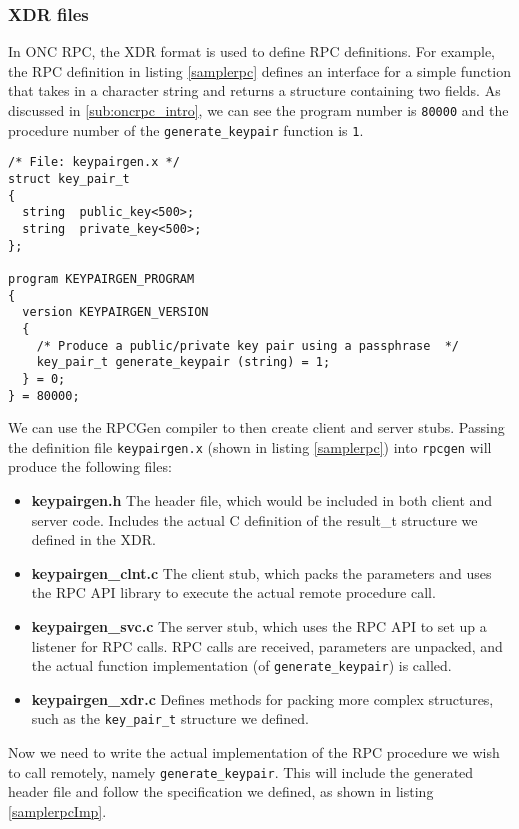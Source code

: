 \subsubsection{XDR files}
\label{sec:xdrsyntax}
In ONC RPC, the XDR format is used to define RPC definitions. For example, the RPC definition in listing \ref{samplerpc} defines an interface for a simple function that takes in a character string  and returns a structure containing two fields. As discussed in \ref{sub:oncrpc_intro}, we can see the program number is \lstinline+80000+ and the procedure number of the \lstinline+generate_keypair+ function is \lstinline+1+.

\begin{lstlisting}
/* File: keypairgen.x */
struct key_pair_t
{
  string  public_key<500>;
  string  private_key<500>;
};

program KEYPAIRGEN_PROGRAM
{
  version KEYPAIRGEN_VERSION
  {
    /* Produce a public/private key pair using a passphrase  */
    key_pair_t generate_keypair (string) = 1;
  } = 0;
} = 80000;
\end{lstlisting}

We can use the RPCGen compiler to then create client and server stubs. Passing the definition file \verb+keypairgen.x+ (shown in listing \ref{samplerpc}) into \lstinline+rpcgen+ will produce the following files:

\begin{itemize}
	\item \textbf{keypairgen.h} The header file, which would be included in both client and server code. Includes the actual C definition of the result\_t structure we defined in the XDR.
	\item \textbf{keypairgen\_clnt.c} The client stub, which packs the parameters and uses the RPC API library to execute the actual remote procedure call.
	\item \textbf{keypairgen\_svc.c} The server stub, which uses the RPC API to set up a listener for RPC calls. RPC calls are received, parameters are unpacked, and the actual function implementation (of \lstinline+generate_keypair+) is called.
	\item \textbf{keypairgen\_xdr.c} Defines methods for packing more complex structures, such as the \lstinline+key_pair_t+ structure we defined.
\end{itemize}

Now we need to write the actual implementation of the RPC procedure we wish to call remotely, namely \lstinline+generate_keypair+. This will include the generated header file and follow the specification we defined, as shown in listing \ref{samplerpcImp}. \\


